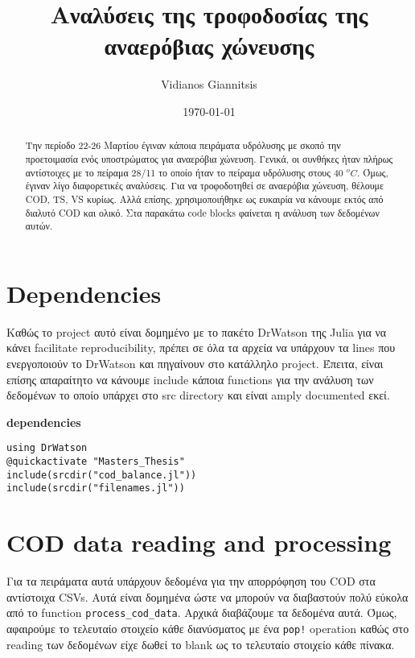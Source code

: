 \documentclass[11pt]{article}
\author{Vidianos Giannitsis}
\date{\today}
\title{Αναλύσεις της τροφοδοσίας της αναερόβιας χώνευσης}
\begin{document}
\maketitle
\tableofcontents

\begin{abstract}
Την περίοδο 22-26 Μαρτίου έγιναν κάποια πειράματα υδρόλυσης με σκοπό την προετοιμασία ενός υποστρώματος για αναερόβια χώνευση. Γενικά, οι συνθήκες ήταν πλήρως αντίστοιχες με το πείραμα 28/11 το οποίο ήταν το πείραμα υδρόλυσης στους 40 \( ^oC \). Όμως, έγιναν λίγο διαφορετικές αναλύσεις. Για να τροφοδοτηθεί σε αναερόβια χώνευση, θέλουμε COD, TS, VS κυρίως. Αλλά επίσης, χρησιμοποιήθηκε ως ευκαιρία να κάνουμε εκτός από διαλυτό COD και ολικό. Στα παρακάτω code blocks φαίνεται η ανάλυση των δεδομένων αυτών.
\end{abstract}

\section{Dependencies}
\label{sec:org2d58e69}
Καθώς το project αυτό είναι δομημένο με το πακέτο DrWatson της Julia για να κάνει facilitate reproducibility, πρέπει σε όλα τα αρχεία να υπάρχουν τα lines που ενεργοποιούν το DrWatson και πηγαίνουν στο κατάλληλο project. Έπειτα, είναι επίσης απαραίτητο να κάνουμε include κάποια functions για την ανάλυση των δεδομένων το οποίο υπάρχει στο src directory και είναι amply documented εκεί.

\textbf{dependencies}
\begin{verbatim}
using DrWatson
@quickactivate "Masters_Thesis"
include(srcdir("cod_balance.jl"))
include(srcdir("filenames.jl"))
\end{verbatim}

\section{COD data reading and processing}
\label{sec:org1417775}
Για τα πειράματα αυτά υπάρχουν δεδομένα για την απορρόφηση του COD στα αντίστοιχα CSVs. Αυτά είναι δομημένα ώστε να μπορούν να διαβαστούν πολύ εύκολα από το function \texttt{process\_cod\_data}. Αρχικά διαβάζουμε τα δεδομένα αυτά. Όμως, αφαιρούμε το τελευταίο στοιχείο κάθε διανύσματος με ένα \texttt{pop!} operation καθώς στο reading των δεδομένων είχε δωθεί το blank ως το τελευταίο στοιχείο κάθε πίνακα.
\end{document}
